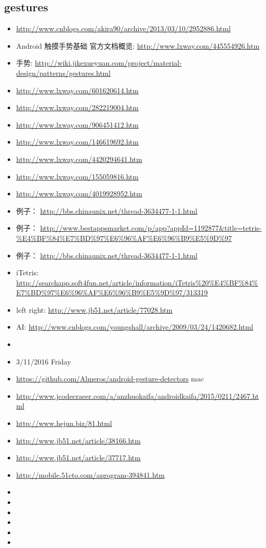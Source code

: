 \documentclass[9pt,b5paper]{article}
\begin{document}
\subsection{gestures}
\label{sec-3-3}
\begin{itemize}
\item \url{http://www.cnblogs.com/akira90/archive/2013/03/10/2952886.html}
\item Android 触摸手势基础 官方文档概览: \url{http://www.lxway.com/445554926.htm}
\item 手势: \url{http://wiki.jikexueyuan.com/project/material-design/patterns/gestures.html}
\item \url{http://www.lxway.com/601620614.htm}
\item \url{http://www.lxway.com/282219004.htm}
\item \url{http://www.lxway.com/906451412.htm}
\item \url{http://www.lxway.com/146619692.htm}
\item \url{http://www.lxway.com/4420294641.htm}
\item \url{http://www.lxway.com/155059816.htm}
\item \url{http://www.lxway.com/4019928952.htm}
\item 例子： \url{http://bbs.chinaunix.net/thread-3634477-1-1.html}
\item 例子： \url{http://www.bestappsmarket.com/p/app?appId=1192877&title=tetris-\%E4\%BF\%84\%E7\%BD\%97\%E6\%96\%AF\%E6\%96\%B9\%E5\%9D\%97}
\item 例子： \url{http://bbs.chinaunix.net/thread-3634477-1-1.html}

\item iTetris: \url{http://searchapp.soft4fun.net/article/information/iTetris\%20\%E4\%BF\%84\%E7\%BD\%97\%E6\%96\%AF\%E6\%96\%B9\%E5\%9D\%97/313319}
\item left right: \url{http://www.jb51.net/article/77028.htm}
\item AI: \url{http://www.cnblogs.com/youngshall/archive/2009/03/24/1420682.html}
\item 
\item 3/11/2016 Friday
\item \url{https://github.com/Almeros/android-gesture-detectors} mac
\item \url{http://www.jcodecraeer.com/a/anzhuokaifa/androidkaifa/2015/0211/2467.html}
\item \url{http://www.hejun.biz/81.html}
\item \url{http://www.jb51.net/article/38166.htm}
\item \url{http://www.jb51.net/article/37717.htm}
\item \url{http://mobile.51cto.com/aprogram-394841.htm}
\item 
\item 
\item 
\item 
\item 
\item 
\end{itemize}
\end{document}
